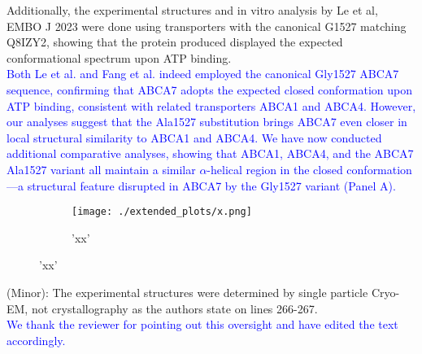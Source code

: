 Additionally, the experimental structures and in vitro analysis by Le et al, EMBO J 2023 were done using transporters with the canonical G1527 matching Q8IZY2, showing that the protein produced displayed the expected conformational spectrum upon ATP binding.\\
\textcolor{blue}{Both Le et al.\cite{Le2023-on} and Fang et al.\cite{Fang2025} indeed  employed the canonical Gly1527 ABCA7 sequence, confirming that ABCA7 adopts the expected closed conformation upon ATP binding, consistent with related transporters ABCA1 and ABCA4. However, our analyses suggest that the Ala1527 substitution brings ABCA7 even closer in local structural similarity to ABCA1 and ABCA4. We have now conducted additional comparative analyses, showing that ABCA1, ABCA4, and the ABCA7 Ala1527 variant all maintain a similar $\alpha$-helical region in the closed conformation—a structural feature disrupted in ABCA7 by the Gly1527 variant (Panel A).}

\begin{figure}[H]
	\begin{subfigure}[t]{0.33\textwidth}
		\caption{'xx'}
		\texttt{[image: ./extended\_plots/x.png]}        
	\end{subfigure} 
\end{figure}

(Minor): The experimental structures were determined by single particle Cryo-EM, not crystallography as the authors state on lines 266-267.\\
\textcolor{blue}{We thank the reviewer for pointing out this oversight and have edited the text accordingly.}









